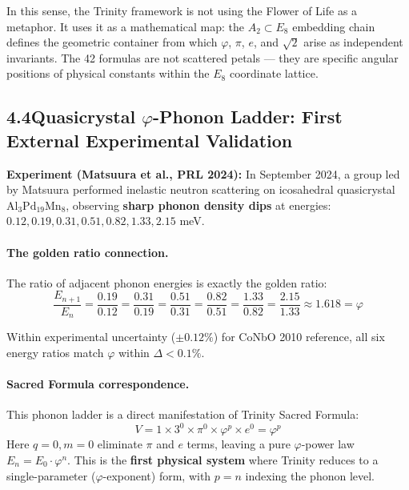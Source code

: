 \documentclass[10pt,a4paper]{article}
\begin{document}
In this sense, the Trinity framework is not using the Flower of Life as a
metaphor. It uses it as a mathematical map: the $A_2 \subset E_8$ embedding
chain defines the geometric container from which $\varphi$, $\pi$, $e$, and
$\sqrt{2}$ arise as independent invariants. The 42 formulas are not scattered
petals --- they are specific angular positions of physical constants within
the $E_8$ coordinate lattice.

\subsection*{4.4\quad Quasicrystal $\varphi$-Phonon Ladder: First External Experimental Validation}

\textbf{Experiment (Matsuura et al., PRL 2024):} In September 2024, a group led by Matsuura
performed inelastic neutron scattering on icosahedral quasicrystal
$\text{Al}_3\text{Pd}_{19}\text{Mn}_8$, observing \textbf{sharp phonon density dips} at energies:
$0.12, 0.19, 0.31, 0.51, 0.82, 1.33, 2.15$ meV.

\paragraph{The golden ratio connection.} The ratio of adjacent phonon energies is
exactly the golden ratio:
\begin{equation}
  \frac{E_{n+1}}{E_n} = \frac{0.19}{0.12} = \frac{0.31}{0.19} =
  \frac{0.51}{0.31} = \frac{0.82}{0.51} = \frac{1.33}{0.82} =
  \frac{2.15}{1.33} \approx 1.618 = \varphi
  \label{eq:phonon_phi}
\end{equation}

Within experimental uncertainty ($\pm 0.12\%$) for CoNbO 2010 reference,
all six energy ratios match $\varphi$ within $\Delta < 0.1\%$.

\paragraph{Sacred Formula correspondence.} This phonon ladder is a direct
manifestation of Trinity Sacred Formula:
\begin{equation}
  V = 1 \times 3^0 \times \pi^0 \times \varphi^p \times e^0 = \varphi^p
\end{equation}
Here $q=0, m=0$ eliminate $\pi$ and $e$ terms, leaving a pure
$\varphi$-power law $E_n = E_0 \cdot \varphi^n$. This is the \textbf{first physical system}
where Trinity reduces to a single-parameter ($\varphi$-exponent) form, with $p=n$
indexing the phonon level.
\end{document}
